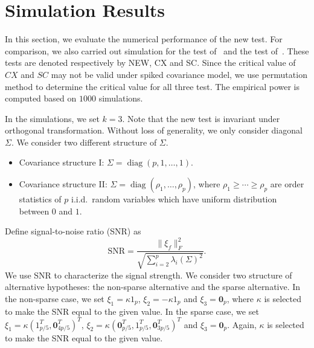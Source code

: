 \documentclass[12pt]{article} %
\DeclareMathOperator{\mytr}{tr}
\DeclareMathOperator{\mydiag}{diag}
\theoremstyle{definition}
\begin{document}




\section{Simulation Results}

In this section, we evaluate the numerical performance of the new test. For comparison, we also carried out simulation for the test of~\citet{Cai2014High} and the test of~\citet{Schott2007Some}.
These tests are denoted respectively by NEW, CX and SC.
Since the critical value of $CX$ and $SC$ may not be valid under spiked covariance model, we use permutation method to determine the critical value for all three test.
The empirical power is computed based on $1000$ simulations.

In the simulations, we set $k=3$.
Note that the new test is invariant under orthogonal transformation.
Without loss of generality, we only consider diagonal $\Sigma$.
We consider two different structure of $\Sigma$.
\begin{itemize}
    \item
        Covariance structure I: $\Sigma=\mydiag(p,1,\ldots,1)$.
    \item
        Covariance structure II: $\Sigma=\mydiag(\rho_1,\ldots,\rho_p)$, where $\rho_1\geq \cdots\geq \rho_p$ are order statistics of $p$ i.i.d.\ random variables which have uniform distribution between $0$ and $1$.
\end{itemize}

Define signal-to-noise ratio (SNR) as
$$
\textrm{SNR}=\frac{\|\xi_f\|_F^2}{\sqrt{\sum_{i=2}^{p}\lambda_i(\Sigma)^2}}.
$$
We use SNR to characterize the signal strength.
We consider two structure of alternative hypotheses: the non-sparse alternative and the sparse alternative.
In the non-sparse case, we set $\xi_1=\kappa 1_p$, $\xi_2=-\kappa 1_p$ and $\xi_3=\mathbf{0}_p$, where $\kappa$ is selected to make the SNR equal to the given value.
In the sparse case, we set $\xi_1=\kappa (1_{p/5}^T,\mathbf{0}_{4p/5}^T)^T$, $\xi_2=\kappa (\mathbf{0}_{p/5}^T, 1_{p/5}^T,\mathbf{0}_{3p/5}^T)^T$ and $\xi_3=\mathbf{0}_p$. Again, $\kappa$ is selected to make the SNR equal to the given value.
\end{document}

